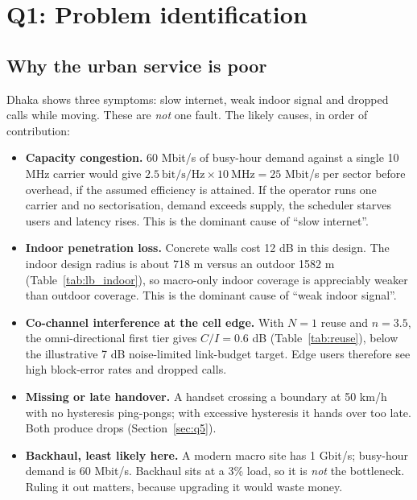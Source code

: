 \documentclass[9pt,a4paper]{extarticle}
\begin{document}
\section{Q1: Problem identification}
\label{sec:q1}

\subsection{Why the urban service is poor}
Dhaka shows three symptoms: slow internet, weak indoor signal and dropped calls while moving.
These are \emph{not} one fault. The likely causes, in order of contribution:

\begin{itemize}[leftmargin=1.4em,itemsep=1pt,topsep=2pt]
\item \textbf{Capacity congestion.} 60 Mbit/s of busy-hour demand against a single 10 MHz carrier
would give $2.5\ \text{bit/s/Hz}\times10\ \text{MHz}=25$ Mbit/s per sector before overhead, if the assumed efficiency is attained. If the
operator runs one carrier and no sectorisation, demand exceeds supply, the scheduler starves
users and latency rises. This is the dominant cause of ``slow internet''.
\item \textbf{Indoor penetration loss.} Concrete walls cost 12 dB in this design. The indoor
design radius is about 718 m versus an outdoor 1582 m (Table~\ref{tab:lb_indoor}), so
macro-only indoor coverage is appreciably weaker than outdoor coverage. This is the dominant cause of ``weak
indoor signal''.
\item \textbf{Co-channel interference at the cell edge.} With $N=1$ reuse and $n=3.5$, the
omni-directional first tier gives $C/I=0.6$ dB (Table~\ref{tab:reuse}), below the illustrative 7 dB noise-limited link-budget target. Edge users therefore see high block-error rates and dropped calls.
\item \textbf{Missing or late handover.} A handset crossing a boundary at 50 km/h with no
hysteresis ping-pongs; with excessive hysteresis it hands over too late. Both produce drops
(Section~\ref{sec:q5}).
\item \textbf{Backhaul, least likely here.} A modern macro site has 1 Gbit/s; busy-hour demand is
60 Mbit/s. Backhaul sits at a 3\% load, so it is \emph{not} the bottleneck. Ruling it out matters,
because upgrading it would waste money.
\end{itemize}
\end{document}
